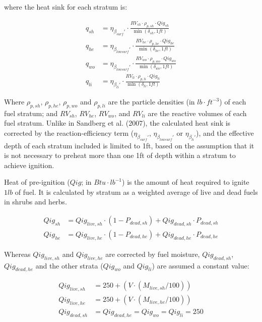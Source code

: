 \documentclass[]{book}
\begin{document}
where the heat sink for each stratum is:

\begin{eqnarray}
q_{sh} &= \eta_{\beta_{surf}'}\cdot \frac{RV_{sh}\cdot \rho_{p,sh}\cdot Qig_{sh}}{\min(\delta_{sh}, 1ft)}\\
q_{he} &= \eta_{\beta_{lowsurf}'}\cdot \frac{RV_{he}\cdot \rho_{p,he}\cdot Qig_{he}}{\min(\delta_{he}, 1ft)}\\
q_{wo} &= \eta_{\beta_{lowsurf}'}\cdot \frac{RV_{wo}\cdot \rho_{p,wo}\cdot Qig_{wo}}{\min(\delta_{wo}, 1ft)}\\
q_{li} &= \eta_{\beta_{li}'}\cdot \frac{RV_{li}\cdot \rho_{p,li}\cdot Qig_{li}}{\min(\delta_{li}, 1ft)}
\label{eq:heatsinkstrat}
\end{eqnarray}

Where \(\rho_{p,sh}\), \(\rho_{p,he}\), \(\rho_{p,wo}\) and
\(\rho_{p,li}\) are the particle densities (in \(lb\cdot ft^{-3}\)) of
each fuel stratum; and \(RV_{sh}\), \(RV_{he}\), \(RV_{wo}\), and
\(RV_{li}\) are the reactive volumes of each fuel stratum. Unlike in
Sandberg et al. (2007), the calculated heat sink is corrected by the
reaction-efficiency term (\(\eta_{\beta_{surf}'}\),
\(\eta_{\beta_{lowsurf}'}\) or \(\eta_{\beta_{li}'}\)), and the
effective depth of each stratum included is limited to 1ft, based on the
assumption that it is not necessary to preheat more than one 1ft of
depth within a stratum to achieve ignition.

Heat of pre-ignition (\(Qig\); in \(Btu \cdot lb^{-1}\)) is the amount
of heat required to ignite \(1 lb\) of fuel. It is calculated by stratum
as a weighted average of live and dead fuels in shrubs and herbs.

\begin{eqnarray}
Qig_{sh} &= Qig_{live, sh} \cdot (1 - P_{dead, sh})+ Qig_{dead, sh} \cdot P_{dead, sh}\\
Qig_{he} &= Qig_{live, he} \cdot (1 - P_{dead, he})+ Qig_{dead, he} \cdot P_{dead, he}
\end{eqnarray}

Whereas \(Qig_{live, sh}\) and \(Qig_{live, he}\) are corrected by fuel
moisture, \(Qig_{dead, sh}\), \(Qig_{dead, he}\) and the other strata
(\(Qig_{wo}\) and \(Qig_{li}\)) are assumed a constant value:

\begin{eqnarray}
Qig_{live, sh} &= 250 + (V\cdot (M_{live, sh}/100))\\
Qig_{live, he} &= 250 + (V\cdot (M_{live, he}/100))\\
Qig_{dead, sh} &= Qig_{dead, he} = Qig_{wo} = Qig_{li} = 250
\end{eqnarray}
\end{document}
